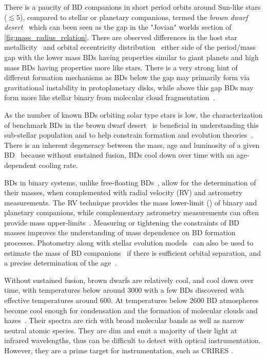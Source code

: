 There is a paucity of {BD} companions in short period orbits around Sun-like stars (\(\lesssim{}5 \)\AU{}), compared to stellar or planetary companions, termed the \emph{brown dwarf desert}~\citep{halbwachs_exploring_2000, zucker_analysis_2001, sahlmann_search_2011, ranc_moa2007blg197_2015} which can been seen as the gap in the "Jovian" worlds section of \cref{fig:mass_radius_relation}.
There are observed differences in the host star metallicity~\citep{maldonado_searching_2017, santos_observational_2017, schlaufman_evidence_2018} and orbital eccentricity distribution~\citep{ma_statistical_2014} either side of the period/mass gap with the lower mass {BD}s having properties similar to giant planets and high mass {BD}s having properties more like stars.
There is a very strong hint of different formation mechanisms as {BD}s below the gap may primarily form via gravitational instability in protoplanetary disks, while above this gap {BD}s may form more like stellar binary from molecular cloud fragmentation~\citep{ma_statistical_2014}.

As the number of known {BD}s orbiting solar type stars is low, the characterization of benchmark {BD}s in the brown dwarf desert~\citep[e.g.][]{crepp_trends_2016} is beneficial in understanding this sub-stellar population and to help constrain formation and evolution theories~\citep{whitworth_formation_2007}.
There is an inherent degeneracy between the mass, age and luminosity of a given BD~\citep{burrows_nongray_1997} because without sustained fusion, {BD}s cool down over time with an age-dependent cooling rate.

{BD}s in binary systems, unlike free-floating {BD}s~\citep[e.g][]{gagne_simp_2017}, allow for the determination of their masses, when complemented with radial velocity ({RV}) and astrometry measurements.
The {RV} technique provides the mass lower-limit (\Mtwosini{}) of binary and planetary companions, while complementary astrometry measurements can often provide mass upper-limits~\citep[e.g.][]{sahlmann_search_2011}.
Measuring or tightening the constraints of {BD} masses improves the understanding of mass dependence on {BD} formation processes.
Photometry along with stellar evolution models~\citep[e.g.][]{baraffe_evolutionary_2003,allard_btsettl_2013} can also be used to estimate the mass of {BD} companions~\citep[e.g.][]{moutou_eccentricity_2017} if there is sufficient orbital separation, and a precise determination of the age~\citep{soderblom_ages_2010}.


Without sustained fusion, brown dwarfs are relatively cool, and cool down over time, with temperatures below around {3000\K{}} with a few BDs discovered with effective temperatures around 600\K{}\citep{leggett_physical_2009}.
At temperatures below 2600\K{} BD atmospheres become cool enough for condensation and the formation of molecular clouds and hazes~\citep{allard_atmospheres_2012, helling_atmospheres_2014}.
Their spectra are rich with broad molecular bands as well as narrow neutral atomic species.
They are dim and emit a majority of their light at infrared wavelengths, thus can be difficult to detect with optical instrumentation.
However, they are a prime target for \nir{} instrumentation, such as CRIRES \citep[e.g.][]{guenther_prospects_2005,crossfield_global_2014}.


